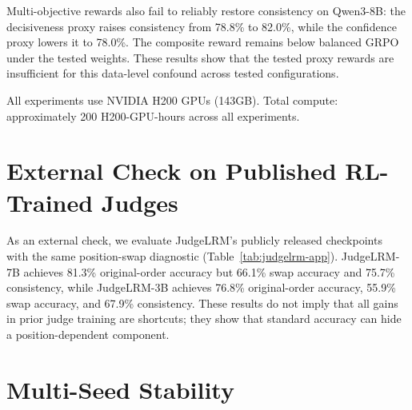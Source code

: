 \documentclass[letterpaper]{article}
\begin{document}
Multi-objective rewards also fail to reliably restore consistency on Qwen3-8B: the decisiveness proxy raises consistency from 78.8\% to 82.0\%, while the confidence proxy lowers it to 78.0\%. The composite reward remains below balanced GRPO under the tested weights. These results show that the tested proxy rewards are insufficient for this data-level confound across tested configurations.

All experiments use NVIDIA H200 GPUs (143GB). Total compute: approximately 200 H200-GPU-hours across all experiments.

\section{External Check on Published RL-Trained Judges}
\label{app:judgelrm}

As an external check, we evaluate JudgeLRM's publicly released checkpoints~\citep{chen2025judgelrm} with the same position-swap diagnostic (Table~\ref{tab:judgelrm-app}). JudgeLRM-7B achieves 81.3\% original-order accuracy but 66.1\% swap accuracy and 75.7\% consistency, while JudgeLRM-3B achieves 76.8\% original-order accuracy, 55.9\% swap accuracy, and 67.9\% consistency. These results do not imply that all gains in prior judge training are shortcuts; they show that standard accuracy can hide a position-dependent component.

\begin{table}[H]
\centering
\scriptsize
\setlength{\tabcolsep}{2.5pt}
\caption{Published RL-trained judges also show a position-dependent component under the swap diagnostic. Bias is the always-first minus always-second inconsistent rate.}
\label{tab:judgelrm-app}
\end{table}

\section{Multi-Seed Stability}
\label{app:seeds}
\end{document}
